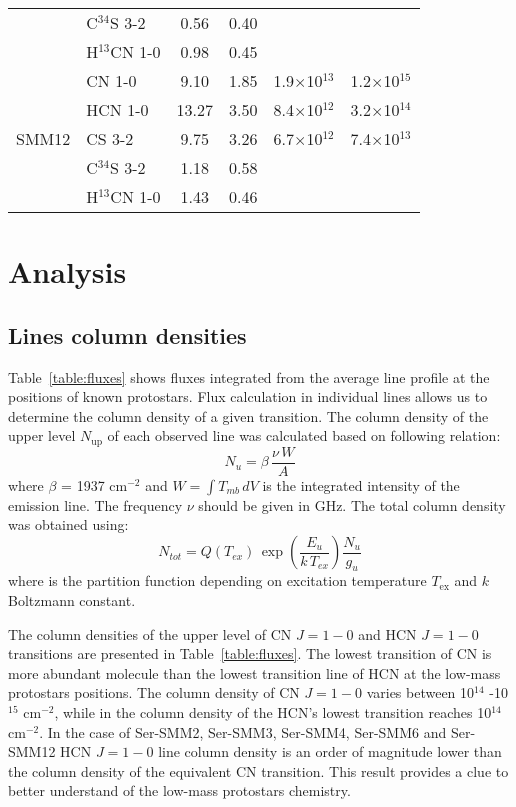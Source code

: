 \documentclass{aa}
\begin{document}
\begin{table*}
\begin{tabular}{l l c c c c}
{} & C$^{34}$S 3-2 & 0.56 & 0.40 &  & \\ 
{} & H$^{13}$CN 1-0 & 0.98 & 0.45 &  &\\ 
\hline
\multirow{5}{*}{SMM12} & CN 1-0 & 9.10 & 1.85 & 1.9$\times$10$^{13}$ & 1.2$\times$10$^{15}$\\
{} & HCN 1-0 & 13.27 & 3.50 & 8.4$\times$10$^{12}$ & 3.2$\times$10$^{14}$\\ 
{} & CS 3-2 & 9.75 & 3.26 & 6.7$\times$10$^{12}$ & 7.4$\times$10$^{13}$\\  
{} & C$^{34}$S 3-2 & 1.18 & 0.58 &  &\\ 
{} & H$^{13}$CN 1-0 & 1.43 & 0.46 & & \\ 
\hline
\end{tabular}
\end{table*}

\section{Analysis}

\subsection{Lines column densities}

Table~\ref{table:fluxes} shows fluxes integrated from the average line profile at the positions of known protostars. 
Flux calculation in individual lines allows us to determine the column density of a given transition. The column density of the upper level $N_\mathrm{up}$ of each observed line was calculated based on following relation:
\begin{equation} \label{eq1}
N_u = \beta \, \frac{\nu \, W}{A}
\end{equation}
where $\beta$ = 1937 cm$^{-2}$ and $W = \int{T_{mb} \, dV}$ is the integrated intensity of the emission line. The frequency $\nu$ should be given in GHz. The total column density was obtained using:
\begin{equation} \label{eq2}
N_{tot} = Q(T_{ex}) \, \exp(\frac{E_u }{k \, T_{ex} })  \frac{N_u }{g_u }
\end{equation}
where is the partition function depending on excitation temperature $T_\mathrm{ex}$ and $k$ Boltzmann constant.

The column densities of the upper level of CN $J=1-0$ and HCN $J=1-0$ transitions are presented in Table~\ref{table:fluxes}. The lowest transition of CN is more abundant molecule than the lowest transition line of HCN at the low-mass protostars positions. The column density of CN $J=1-0$ varies between 10$^{14}$ -10$^{15}$ cm$^{-2}$, while in the column density of the HCN’s lowest transition reaches 10$^{14}$ cm$^{-2}$. In the case of Ser-SMM2, Ser-SMM3, Ser-SMM4, Ser-SMM6 and Ser-SMM12 HCN $J=1-0$ line column density is an order of magnitude lower than the column density of the equivalent CN transition. This result provides a clue to better understand of the low-mass protostars chemistry. 
\end{document}
